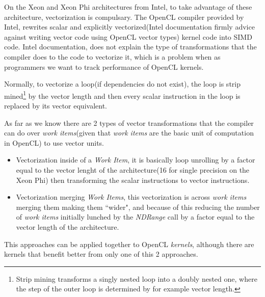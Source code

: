 \par{On the Xeon and Xeon Phi architectures from Intel, to take advantage of these architecture, vectorization is compulsary.
    The OpenCL compiler provided by Intel, rewrites scalar and explicitly vectorized(Intel documentation firmly 
    advice against writing vector code using OpenCL vector types) kernel code into SIMD code. Intel documentation,
    does not explain the type of transformations that the compiler does to the code to vectorize it, which is a 
    problem when as programmers we want to track performance of OpenCL kernels.}

\par{Normally, to vectorize a loop(if dependencies do not exist), the loop is strip mined\footnote{Strip mining 
    transforms a singly nested loop into a doubly nested one, where the step of the outer loop is determined by for example
    vector length\cite{loops}.} by the vector length and then every scalar instruction in the loop is replaced by its 
    vector equivalent\cite{vector}.}

\par{As far as we know there are 2 types of vector transformations that the compiler can do over \emph{work items}(given
    that \emph{work items} are the basic unit of computation in OpenCL) to use vector units.}

\begin{itemize}
    \item Vectorization inside of a \emph{Work Item}, it is basically loop unrolling by a factor equal to the vector lenght of the
    architecture(16 for single precision on the Xeon Phi) then transforming the scalar instructions to vector instructions.

    \item Vectorization merging \emph{Work Items}, this vectorization is across \emph{work items} merging them making them 
    ``wider", and because of this reducing the number of \emph{work items} initially lunched by the 
    \emph{NDRange} call by a factor equal to the vector length of the architecture.
\end{itemize}

\par{This approaches can be applied together to OpenCL \emph{kernels}, although there are kernels that benefit better from 
    only one of this 2 approaches\cite{vector}.}
    




